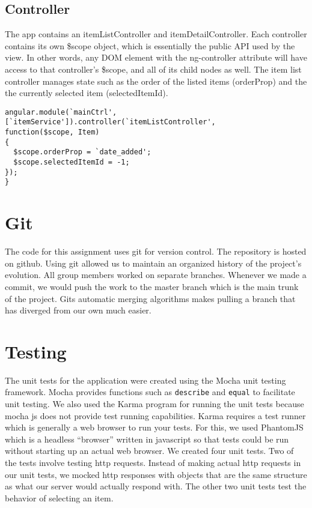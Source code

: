 \documentclass[letterpaper, 12pt]{article}
\begin{document}
\begin{itemize}
\subsection{Controller}
\noindent The app contains an itemListController and itemDetailController.  Each controller contains its own \$scope object, which is essentially the public API used by the view. In other words, any DOM element with the ng-controller attribute will have access to that controller's \$scope, and all of its child nodes as well. The item list controller manages state such as the order of the listed items (orderProp) and the the currently selected item (selectedItemId).

\vspace{2mm}
\vspace{-3mm}\begin{verbatim}
angular.module(`mainCtrl',
[`itemService']).controller(`itemListController',
function($scope, Item) 
{
  $scope.orderProp = `date_added';
  $scope.selectedItemId = -1;
}); 
}
\end{verbatim}

\section{Git}
The code for this assignment uses git for version control. The repository is
hosted on github.  Using git allowed us to maintain an organized history of the project's evolution.  All group members worked on separate branches. Whenever we made a commit, we would push the work to the master branch which is the main trunk of the project. Gits automatic merging algorithms makes pulling a branch that has diverged from our own much easier.

\section{Testing}
The unit tests for the application were created using the Mocha unit testing framework.  Mocha provides functions such as \texttt{describe} and \texttt{equal} to facilitate unit testing. We also used the Karma program for running the unit tests because mocha js does not provide test running capabilities. Karma requires a test runner which is generally a web browser to run your tests.  For this, we used PhantomJS which is a headless ``browser'' written in javascript so that tests could be run without starting up an actual web browser.  We created four unit tests.  Two of the tests involve testing http requests.  Instead of making actual http requests in our unit tests, we mocked http responses with objects that are the same structure as what our server would actually respond with.  The other two unit tests test the behavior of selecting an item.


\end{itemize}
\end{document}
